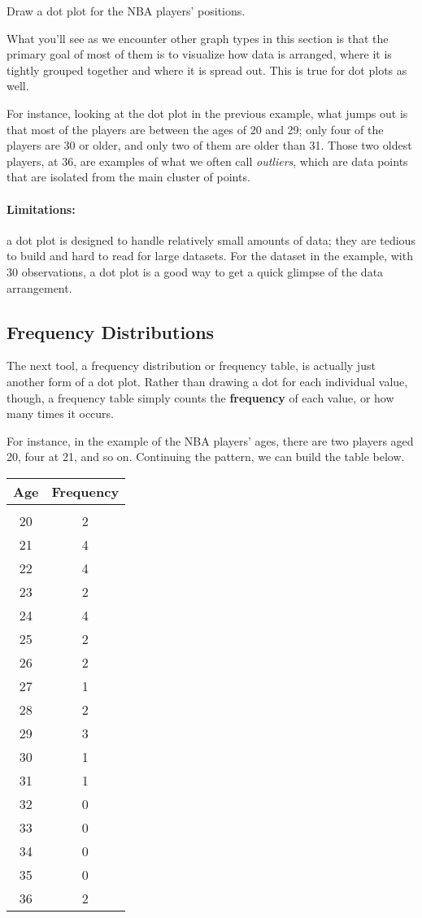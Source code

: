 \begin{try}
Draw a dot plot for the NBA players' positions.
\end{try}
\pagebreak

What you'll see as we encounter other graph types in this section is that the primary goal of most of them is to visualize how data is arranged, where it is tightly grouped together and where it is spread out.  This is true for dot plots as well.

For instance, looking at the dot plot in the previous example, what jumps out is that most of the players are between the ages of 20 and 29; only four of the players are 30 or older, and only two of them are older than 31.  Those two oldest players, at 36, are examples of what we often call \emph{outliers}, which are data points that are isolated from the main cluster of points.

\paragraph{Limitations:} a dot plot is designed to handle relatively small amounts of data; they are tedious to build and hard to read for large datasets.  For the dataset in the example, with 30 observations, a dot plot is a good way to get a quick glimpse of the data arrangement.

\subsection{Frequency Distributions}
The next tool, a frequency distribution or frequency table, is actually just another form of a dot plot.  Rather than drawing a dot for each individual value, though, a frequency table simply counts the \textbf{frequency} of each value, or how many times it occurs.

For instance, in the example of the NBA players' ages, there are two players aged 20, four at 21, and so on.  Continuing the pattern, we can build the table below.
\begin{center}
\begin{tabular}{c c}
\textbf{Age} & \textbf{Frequency}\\
\hline
& \\
20 & 2\\
21 & 4\\
22 & 4\\
23 & 2\\
24 & 4\\
25 & 2\\
26 & 2\\
27 & 1\\
28 & 2\\
29 & 3\\
30 & 1\\
31 & 1\\
32 & 0\\
33 & 0\\
34 & 0\\
35 & 0\\
36 & 2
\end{tabular}
\end{center}

